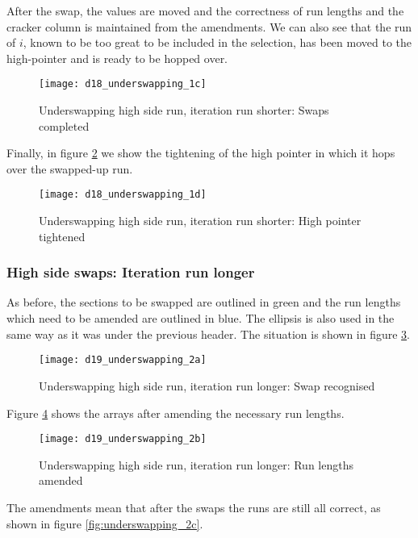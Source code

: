 After the swap, the values are moved and the correctness of run lengths and the cracker column is maintained from the amendments. We can also see that the run of $i$, known to be too great to be included in the selection, has been moved to the high-pointer and is ready to be hopped over.

\begin{figure}[H]
  \centering
  \texttt{[image: d18\_underswapping\_1c]}
  \caption{Underswapping high side run, iteration run shorter: Swaps completed}
  \label{fig:underswapping_1c}
\end{figure}

Finally, in figure \ref{fig:underswapping_1d} we show the tightening of the high pointer in which it hops over the swapped-up run.

\begin{figure}[H]
  \centering
  \texttt{[image: d18\_underswapping\_1d]}
  \caption{Underswapping high side run, iteration run shorter: High pointer tightened}
  \label{fig:underswapping_1d}
\end{figure}

\subsubsection{High side swaps: Iteration run longer}

As before, the sections to be swapped are outlined in green and the run lengths which need to be amended are outlined in blue. The ellipsis is also used in the same way as it was under the previous header. The situation is shown in figure \ref{fig:underswapping_2a}.

\begin{figure}[H]
  \centering
  \texttt{[image: d19\_underswapping\_2a]}
  \caption{Underswapping high side run, iteration run longer: Swap recognised}
  \label{fig:underswapping_2a}
\end{figure}

Figure \ref{fig:underswapping_2b} shows the arrays after amending the necessary run lengths.

\begin{figure}[H]
  \centering
  \texttt{[image: d19\_underswapping\_2b]}
  \caption{Underswapping high side run, iteration run longer: Run lengths amended}
  \label{fig:underswapping_2b}
\end{figure}

The amendments mean that after the swaps the runs are still all correct, as shown in figure \ref{fig:underswapping_2c}.

